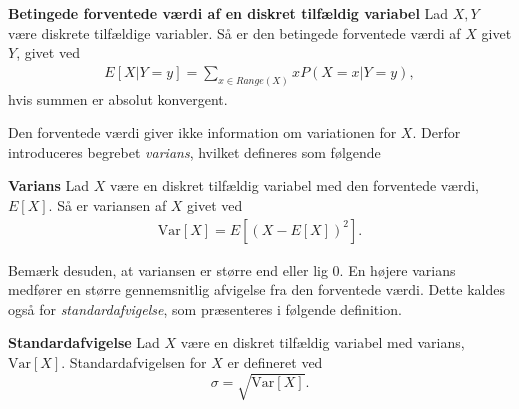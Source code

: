 \begin{minipage}\textwidth
\begin{defn}\textbf{Betingede forventede værdi af en diskret tilfældig variabel}\label{def:betinget_forventet_værdi_af_diskrete_tilfældige_variabler} %
\newline
Lad $X, Y$ være diskrete tilfældige variabler. Så er den betingede forventede værdi af $X$ givet $Y$, givet ved
\begin{align*}
    E[X|Y=y] = \sum_{x\in Range(X)}xP(X=x|Y=y),
\end{align*}
hvis summen er absolut konvergent.
\end{defn}
\end{minipage}

Den forventede værdi giver ikke information om variationen for $X$. Derfor introduceres begrebet \textit{varians}, hvilket defineres som følgende

\begin{minipage}\textwidth
\begin{defn}\textbf{Varians}\label{def:varians} %
\newline
Lad $X$ være en diskret tilfældig variabel med den forventede værdi, $E[X]$. Så er variansen af $X$ givet ved
\begin{align*}
    \text{Var}[X]=E\left[\left(X-E[X]\right)^2\right].
\end{align*}
\end{defn}
\end{minipage}



Bemærk desuden, at variansen er større end eller lig $0$. En højere varians medfører en større gennemsnitlig afvigelse fra den forventede værdi. Dette kaldes også for \textit{standardafvigelse}, som præsenteres i følgende definition.

\begin{minipage}\textwidth
\begin{defn}\label{def:standardafvigelse}\textbf{Standardafvigelse} %
\newline
Lad $X$ være en diskret tilfældig variabel med varians, $\text{Var}[X]$. Standardafvigelsen for $X$ er defineret ved
$$\sigma = \sqrt{\text{Var}[X]}.$$
\end{defn}
\end{minipage}

